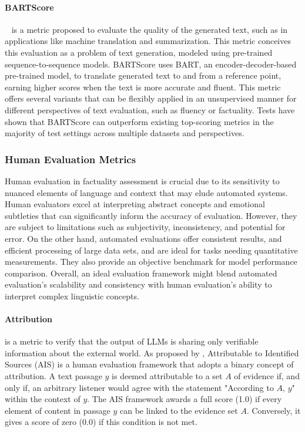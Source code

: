\paragraph{BARTScore} ~\citep{yuan2021bartscore} is a metric proposed to evaluate the quality of the generated text, such as in applications like machine translation and summarization. This metric conceives this evaluation as a problem of text generation, modeled using pre-trained sequence-to-sequence models. BARTScore uses BART, an encoder-decoder-based pre-trained model, to translate generated text to and from a reference point, earning higher scores when the text is more accurate and fluent. This metric offers several variants that can be flexibly applied in an unsupervised manner for different perspectives of text evaluation, such as fluency or factuality. Tests have shown that BARTScore can outperform existing top-scoring metrics in the majority of test settings across multiple datasets and perspectives. 


\subsubsection{Human Evaluation Metrics}

Human evaluation in factuality assessment is crucial due to its sensitivity to nuanced elements of language and context that may elude automated systems. Human evaluators excel at interpreting abstract concepts and emotional subtleties that can significantly inform the accuracy of evaluation. However, they are subject to limitations such as subjectivity, inconsistency, and potential for error. On the other hand, automated evaluations offer consistent results, and efficient processing of large data sets, and are ideal for tasks needing quantitative measurements. They also provide an objective benchmark for model performance comparison. Overall, an ideal evaluation framework might blend automated evaluation's scalability and consistency with human evaluation's ability to interpret complex linguistic concepts.


\paragraph{Attribution} is a metric to verify that the output of LLMs is sharing only verifiable information about the external world. 
As proposed by \citep{rashkin2023measuring}, Attributable to Identified Sources (AIS) is a human evaluation framework that adopts a binary concept of attribution. A text passage $y$ is deemed attributable to a set $A$ of evidence if, and only if, an arbitrary listener would agree with the statement "According to $A$, $y$" within the context of $y$. The AIS framework awards a full score (1.0) if every element of content in passage $y$ can be linked to the evidence set $A$. Conversely, it gives a score of zero (0.0) if this condition is not met.

